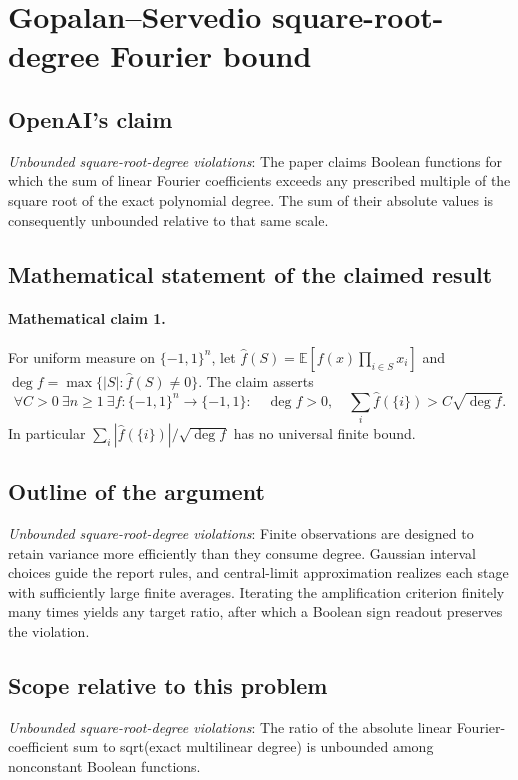 \documentclass[11pt]{article}
\begin{document}
\section*{Gopalan–Servedio square-root-degree Fourier bound}

\subsection{OpenAI's claim}
\textit{Unbounded square-root-degree violations}: The paper claims Boolean functions for which the sum of linear Fourier coefficients exceeds any prescribed multiple of the square root of the exact polynomial degree. The sum of their absolute values is consequently unbounded relative to that same scale.

\subsection{Mathematical statement of the claimed result}
\paragraph{Mathematical claim 1.} For uniform measure on $\{-1,1\}^n$, let $\widehat f(S)=\mathbb E[f(x)\prod_{i\in S}x_i]$ and $\deg f=\max\{|S|:\widehat f(S)\ne0\}$. The claim asserts \[\forall C>0\ \exists n\ge1\ \exists f:\{-1,1\}^n\to\{-1,1\}:\quad\deg f>0,\quad\sum_i\widehat f(\{i\})>C\sqrt{\deg f}.\] In particular $\sum_i|\widehat f(\{i\})|/\sqrt{\deg f}$ has no universal finite bound.

\subsection{Outline of the argument}
\textit{Unbounded square-root-degree violations}: Finite observations are designed to retain variance more efficiently than they consume degree. Gaussian interval choices guide the report rules, and central-limit approximation realizes each stage with sufficiently large finite averages. Iterating the amplification criterion finitely many times yields any target ratio, after which a Boolean sign readout preserves the violation.

\subsection{Scope relative to this problem}
\textit{Unbounded square-root-degree violations}: The ratio of the absolute linear Fourier-coefficient sum to sqrt(exact multilinear degree) is unbounded among nonconstant Boolean functions.
\end{document}
